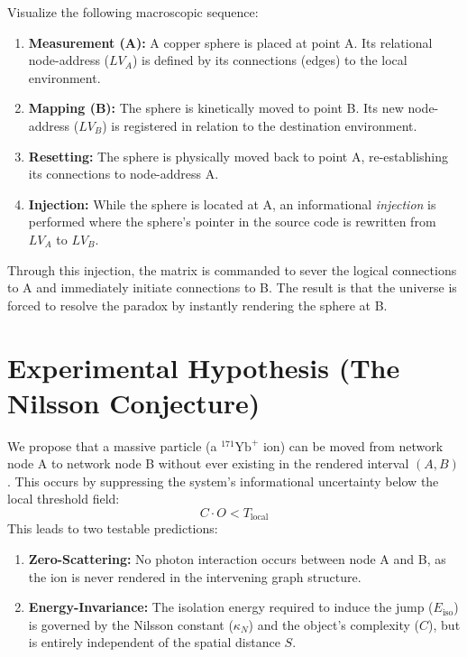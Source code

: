 \documentclass[12pt,a4paper]{article}
\begin{document}
Visualize the following macroscopic sequence:
\begin{enumerate}
    \item \textbf{Measurement (A):} A copper sphere is placed at point A. Its relational node-address ($LV_A$) is defined by its connections (edges) to the local environment.
    \item \textbf{Mapping (B):} The sphere is kinetically moved to point B. Its new node-address ($LV_B$) is registered in relation to the destination environment.
    \item \textbf{Resetting:} The sphere is physically moved back to point A, re-establishing its connections to node-address A.
    \item \textbf{Injection:} While the sphere is located at A, an informational \textit{injection} is performed where the sphere's pointer in the source code is rewritten from $LV_A$ to $LV_B$.
\end{enumerate}

Through this injection, the matrix is commanded to sever the logical connections to A and immediately initiate connections to B. The result is that the universe is forced to resolve the paradox by instantly rendering the sphere at B.

\section{Experimental Hypothesis (The Nilsson Conjecture)}
We propose that a massive particle (a $^{171}\text{Yb}^+$ ion) can be moved from network node A to network node B without ever existing in the rendered interval $(A, B)$. This occurs by suppressing the system's informational uncertainty below the local threshold field:
\begin{equation}
C \cdot O < T_{\mathrm{local}}
\end{equation}
This leads to two testable predictions:
\begin{enumerate}
    \item \textbf{Zero-Scattering:} No photon interaction occurs between node A and B, as the ion is never rendered in the intervening graph structure.
    \item \textbf{Energy-Invariance:} The isolation energy required to induce the jump ($E_{\mathrm{iso}}$) is governed by the Nilsson constant ($\kappa_N$) and the object's complexity ($C$), but is entirely independent of the spatial distance $S$.
\end{enumerate}
\end{document}
